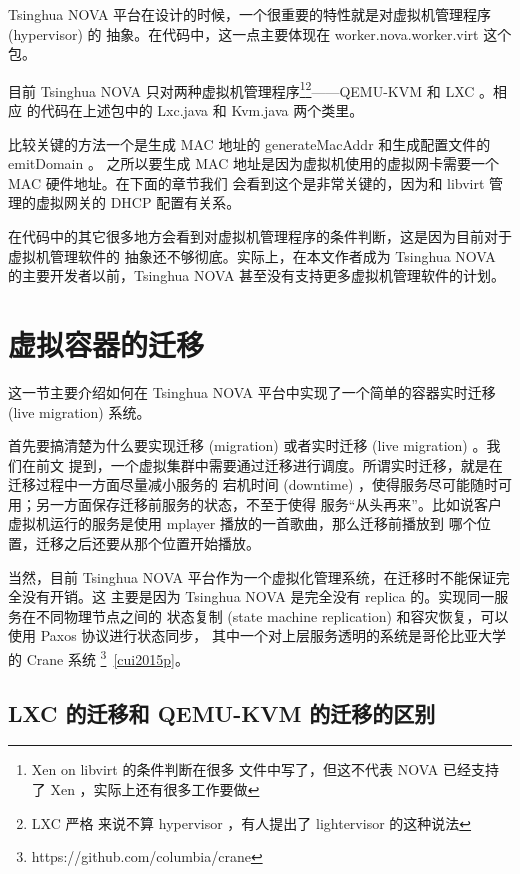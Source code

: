 
Tsinghua NOVA 平台在设计的时候，一个很重要的特性就是对虚拟机管理程序 (hypervisor) 的
抽象。在代码中，这一点主要体现在 worker.nova.worker.virt 这个包。

目前 Tsinghua NOVA 只对两种虚拟机管理程序\footnote{Xen on libvirt 的条件判断在很多
文件中写了，但这不代表 NOVA 已经支持了 Xen ，实际上还有很多工作要做}\footnote{LXC 严格
来说不算 hypervisor ，有人提出了 lightervisor 的这种说法}——QEMU-KVM 和 LXC 。相应
的代码在上述包中的 Lxc.java 和 Kvm.java 两个类里。

比较关键的方法一个是生成 MAC 地址的 generateMacAddr 和生成配置文件的 emitDomain 。
之所以要生成 MAC 地址是因为虚拟机使用的虚拟网卡需要一个 MAC 硬件地址。在下面的章节我们
会看到这个是非常关键的，因为和 libvirt 管理的虚拟网关的 DHCP 配置有关系。

在代码中的其它很多地方会看到对虚拟机管理程序的条件判断，这是因为目前对于虚拟机管理软件的
抽象还不够彻底。实际上，在本文作者成为 Tsinghua NOVA 的主要开发者以前，Tsinghua NOVA
甚至没有支持更多虚拟机管理软件的计划。

\section{虚拟容器的迁移}

这一节主要介绍如何在 Tsinghua NOVA 平台中实现了一个简单的容器实时迁移 (live migration)
系统。

首先要搞清楚为什么要实现迁移 (migration) 或者实时迁移 (live migration) 。我们在前文
提到，一个虚拟集群中需要通过迁移进行调度。所谓实时迁移，就是在迁移过程中一方面尽量减小服务的
宕机时间 (downtime) ，使得服务尽可能随时可用；另一方面保存迁移前服务的状态，不至于使得
服务“从头再来”。比如说客户虚拟机运行的服务是使用 mplayer 播放的一首歌曲，那么迁移前播放到
哪个位置，迁移之后还要从那个位置开始播放。

当然，目前 Tsinghua NOVA 平台作为一个虚拟化管理系统，在迁移时不能保证完全没有开销。这
主要是因为 Tsinghua NOVA 是完全没有 replica 的。实现同一服务在不同物理节点之间的
状态复制 (state machine replication) 和容灾恢复，可以使用 Paxos 协议进行状态同步，
其中一个对上层服务透明的系统是哥伦比亚大学的 Crane 系统
\footnote{https://github.com/columbia/crane}~\ref{cui2015p}。

\subsection{LXC 的迁移和 QEMU-KVM 的迁移的区别}


